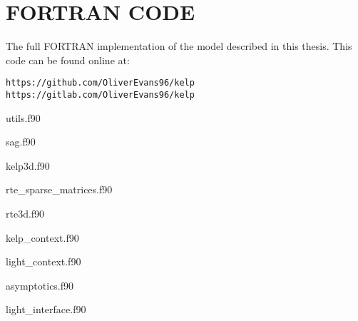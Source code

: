 \chapter{FORTRAN CODE}
\label{chap:fortran}

The full FORTRAN implementation of the model described in this thesis.
This code can be found online at:

\begin{verbatim}
https://github.com/OliverEvans96/kelp
https://gitlab.com/OliverEvans96/kelp
\end{verbatim}

utils.f90


sag.f90


kelp3d.f90


rte\_sparse\_matrices.f90


rte3d.f90


kelp\_context.f90


light\_context.f90


asymptotics.f90


light\_interface.f90


